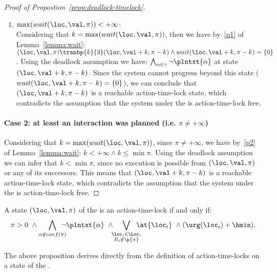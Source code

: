 \begin{proof}[Proof of Propostion~\ref{prop:deadlock-timelock}]
\begin{enumerate}
\begin{enumerate}
      \item $\max(wait(\loc,\val,\pi))<+\infty$:\\
        Considering that $k=\max(wait(\loc,\val,\pi))$, then we have by~\ref{p1} of Lemma~\ref{lemma:wait}:
        $(\loc,\val,\pi)\tranbp{k}{3}(\loc,\val+k,\pi-k)\wedge wait(\loc,\val+k,\pi-k)=\{0\}$.
    Using the deadlock assumption we have: $\bigwedge_{\alpha\in\gamma}\neg\plntxt{\alpha}$ at state $(\loc,\val+k,\pi-k)$.
        Since the system cannot progress beyond this state ($wait(\loc,\val+k,\pi-k)=\{0\}$), we can conclude that $(\loc,\val+k,\pi-k)$ is 
    a reachable action-time-lock state, which contradicts the assumption that the system under the \lps is action-time-lock free.
      
    \end{enumerate}
\end{enumerate}

\paragraph*{Case 2: at least an interaction was planned (i.e. $\pi \neq +\infty$)}
Considering that $k=\max(wait(\loc,\val,\pi))$, since $\pi\neq+\infty$, we have by~\ref{p2} of Lemma~\ref{lemma:wait}:
$k<+\infty\wedge k\le\min\pi$. Using the deadlock assumption we can infer that $k<\min\pi$, since 
no execution is possible from $(\loc,\val,\pi)$ or any of its successors. 
This means that $(\loc,\val+k,\pi-k)$ is a reachable action-time-lock state, which contradicts the assumption that the system under the \lpsabr is action-time-lock free.
\end{proof}

\begin{proposition}\label{prop:timelocks}
A state $(\loc,\val,\pi)$ of the \lps is an action-time-lock if and only if:
\begin{displaymath}
  \pi>0 \ \wedge \bigwedge_{\alpha \notin conf(\pi)} \hspace*{-2ex} \neg\plntxt{\alpha} \ \wedge
  \hspace*{-1ex} \bigvee_{\substack{\loc_i \in \Loc_i \\ B_i \notin \p{\pi}}} \hspace*{-2ex} \at{\loc_i} \ \wedge (\urg(\loc_i) + \hmin).
\end{displaymath}
\end{proposition}
The above proposition derives directly from the definition of action-time-locks on a state of the \lps. 


